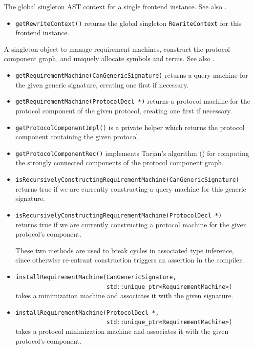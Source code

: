 \documentclass[../generics]{subfiles}
\begin{document}
The global singleton AST context for a single frontend instance. See also .
\begin{itemize}
\item \texttt{getRewriteContext()} returns the global singleton \texttt{RewriteContext} for this frontend instance.
\end{itemize}

A singleton object to manage requirement machines, construct the protocol component graph, and uniquely allocate symbols and terms. See also .
\begin{itemize}
\item \texttt{getRequirementMachine(CanGenericSignature)} returns a query machine for the given generic signature, creating one first if necessary.
\item \texttt{getRequirementMachine(ProtocolDecl *)} returns a protocol machine for the protocol component of the given protocol, creating one first if necessary.
\item \texttt{getProtocolComponentImpl()} is a private helper which returns the protocol component containing the given protocol.
\item \texttt{getProtocolComponentRec()} implements Tarjan's algorithm () for computing the strongly connected components of the protocol component graph.
\item \texttt{isRecursivelyConstructingRequirementMachine(CanGenericSignature)}\\
returns true if we are currently constructing a query machine for this generic signature.
\item \texttt{isRecursivelyConstructingRequirementMachine(ProtocolDecl *)}\\
returns true if we are currently constructing a protocol machine for the given protocol's component.

These two methods are used to break cycles in associated type inference, since otherwise re-entrant construction triggers an assertion in the compiler.
\item
\verb|installRequirementMachine(CanGenericSignature,|\\
\verb|                          std::unique_ptr<RequirementMachine>)|\\
takes a minimization machine and associates it with the given signature.
\item
\verb|installRequirementMachine(ProtocolDecl *,|\\
\verb|                          std::unique_ptr<RequirementMachine>)|\\
takes a protocol minimization machine and associates it with the given protocol's component.
\end{itemize}
\end{document}
